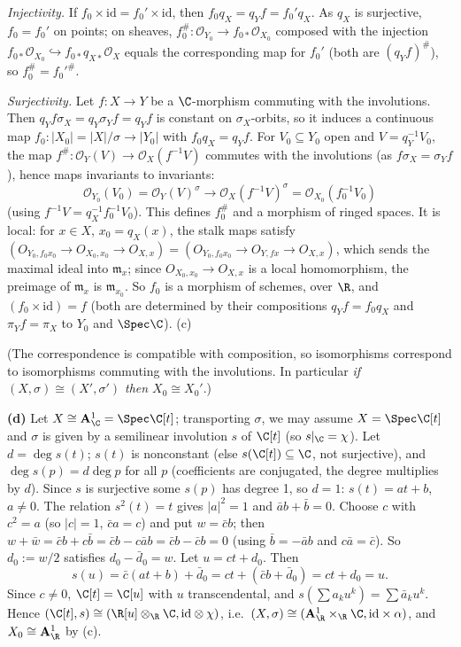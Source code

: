\documentclass[11pt]{article}
\begin{document}
\emph{Injectivity.} If $f_0\times\mathrm{id}=f_0'\times\mathrm{id}$, then $f_0q_X=q_Yf=f_0'q_X$. As $q_X$ is surjective, $f_0=f_0'$ on points; on sheaves, $f_0^\#:\mathcal O_{Y_0}\to f_{0*}\mathcal O_{X_0}$ composed with the injection $f_{0*}\mathcal O_{X_0}\hookrightarrow f_{0*}q_{X*}\mathcal O_X$ equals the corresponding map for $f_0'$ (both are $(q_Yf)^\#$), so $f_0^\#=f_0'^\#$.

\emph{Surjectivity.} Let $f:X\to Y$ be a $\C$-morphism commuting with the involutions. Then $q_Yf\sigma_X=q_Y\sigma_Yf=q_Yf$ is constant on $\sigma_X$-orbits, so it induces a continuous map $f_0:|X_0|=|X|/\sigma\to|Y_0|$ with $f_0q_X=q_Yf$. For $V_0\subseteq Y_0$ open and $V=q_Y^{-1}V_0$, the map $f^\#:\mathcal O_Y(V)\to\mathcal O_X(f^{-1}V)$ commutes with the involutions (as $f\sigma_X=\sigma_Yf$), hence maps invariants to invariants:
\[
\mathcal O_{Y_0}(V_0)=\mathcal O_Y(V)^\sigma\to\mathcal O_X(f^{-1}V)^\sigma=\mathcal O_{X_0}(f_0^{-1}V_0)
\]
(using $f^{-1}V=q_X^{-1}f_0^{-1}V_0$). This defines $f_0^\#$ and a morphism of ringed spaces. It is local: for $x\in X$, $x_0=q_X(x)$, the stalk maps satisfy $(O_{Y_0,f_0x_0}\to O_{X_0,x_0}\to O_{X,x})=(O_{Y_0,f_0x_0}\to O_{Y,fx}\to O_{X,x})$, which sends the maximal ideal into $\mathfrak m_x$; since $O_{X_0,x_0}\to O_{X,x}$ is a local homomorphism, the preimage of $\mathfrak m_x$ is $\mathfrak m_{x_0}$. So $f_0$ is a morphism of schemes, over $\R$, and $(f_0\times\mathrm{id})=f$ (both are determined by their compositions $q_Yf=f_0q_X$ and $\pi_Yf=\pi_X$ to $Y_0$ and $\Spec\C$). \hfill(c)

(The correspondence is compatible with composition, so isomorphisms correspond to isomorphisms commuting with the involutions. In particular \emph{if $(X,\sigma)\cong(X',\sigma')$ then $X_0\cong X_0'$}.)

\textbf{(d)} Let $X\cong\mathbf A^1_{\C}=\Spec\C[t]$; transporting $\sigma$, we may assume $X=\Spec\C[t]$ and $\sigma$ is given by a semilinear involution $s$ of $\C[t]$ (so $s|_{\C}=\chi$). Let $d=\deg s(t)$; $s(t)$ is nonconstant (else $s(\C[t])\subseteq\C$, not surjective), and $\deg s(p)=d\deg p$ for all $p$ (coefficients are conjugated, the degree multiplies by $d$). Since $s$ is surjective some $s(p)$ has degree 1, so $d=1$: $s(t)=at+b$, $a\neq0$. The relation $s^2(t)=t$ gives $|a|^2=1$ and $\bar ab+\bar b=0$. Choose $c$ with $c^2=a$ (so $|c|=1$, $\bar ca=c$) and put $w=\bar cb$; then $w+\bar w=\bar cb+c\bar b=\bar cb-c\bar ab=\bar cb-\bar cb=0$ (using $\bar b=-\bar ab$ and $c\bar a=\bar c$). So $d_0:=w/2$ satisfies $d_0-\bar d_0=w$. Let $u=ct+d_0$. Then
\[
s(u)=\bar c(at+b)+\bar d_0=ct+(\bar cb+\bar d_0)=ct+d_0=u.
\]
Since $c\neq0$, $\C[t]=\C[u]$ with $u$ transcendental, and $s(\sum a_ku^k)=\sum\bar a_ku^k$. Hence $(\C[t],s)\cong(\R[u]\otimes_{\R}\C,\mathrm{id}\otimes\chi)$, i.e.\ $(X,\sigma)\cong(\mathbf A^1_{\R}\times_{\R}\C,\mathrm{id}\times\alpha)$, and $X_0\cong\mathbf A^1_{\R}$ by (c).
\end{document}
